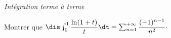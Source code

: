\documentclass[a4paper,10pt]{report}
\begin{document}
\medskip

\begin{center}
\textit{{ {\large Intégration terme à terme}}}
\end{center}

\medskip

\begin{Exa} Montrer que $\dis \int_{0}^1 \dfrac{\ln(1+t)}{t}\dt = \sum_{n=1}^{+ \infty} \dfrac{(-1)^{n-1}}{n^2} \cdot$
\end{Exa}
\end{document}
